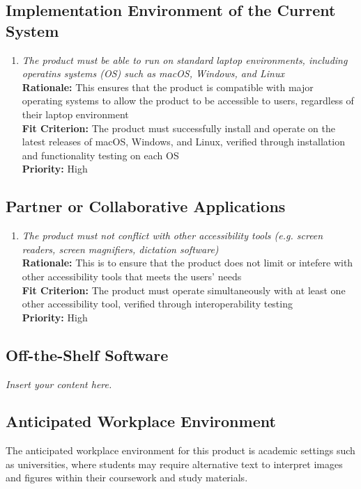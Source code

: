 \documentclass[12pt]{article}
\newcommand{\lips}{\textit{Insert your content here.}}
\begin{document}
\subsection{Implementation Environment of the Current System}
\begin{enumerate}[label=MD-IE \arabic*., wide=0pt, leftmargin=*]
  \item \emph{The product must be able to run on standard laptop environments, including operatins systems (OS) such as 
  macOS, Windows, and Linux}\\[2mm]
    {\bf Rationale:} This ensures that the product is compatible with major operating systems to allow the product to be 
    accessible to users, regardless of their laptop environment\\
    {\bf Fit Criterion:} The product must successfully install and operate on the latest releases of macOS, Windows, and Linux,
    verified through installation and functionality testing on each OS\\
    {\bf Priority:} High
\end{enumerate}
\subsection{Partner or Collaborative Applications}
\begin{enumerate}[label=MD-PA \arabic*., wide=0pt, leftmargin=*]
  \item \emph{The product must not conflict with other accessibility tools (e.g. screen readers, screen magnifiers, dictation software)}\\[2mm]
    {\bf Rationale:} This is to ensure that the product does not limit or intefere with other accessibility tools that 
    meets the users' needs \\
    {\bf Fit Criterion:} The product must operate simultaneously with at least one other accessibility tool,
    verified through interoperability testing \\
    {\bf Priority:} High
\end{enumerate}
\subsection{Off-the-Shelf Software}
\lips
\subsection{Anticipated Workplace Environment}
The anticipated workplace environment for this product is academic settings such as universities, where students may 
require alternative text to interpret images and figures within their coursework and study materials.
\end{document}
